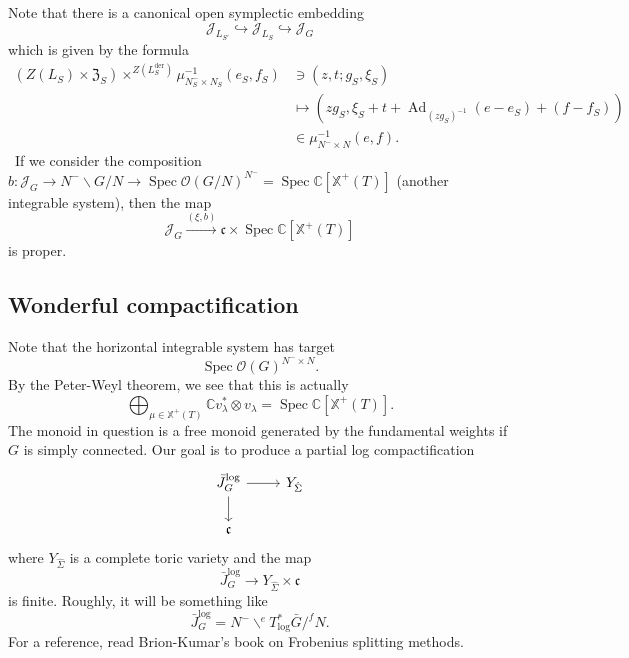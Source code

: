 \documentclass{amsart}
\theoremstyle{definition}
\theoremstyle{remark}
\theoremstyle{plain}
\theoremstyle{definition}
\theoremstyle{remark}
\newcommand{\C}{\mathbb{C}}
\newcommand{\mc}[1]{\mathcal{#1}}
\newcommand{\mf}[1]{\mathfrak{#1}}
\newcommand{\on}[1]{\operatorname{#1}}
\newcommand{\1}{\mathbf{1}}
\newcommand{\2}{\mathbf{2}}
\newcommand{\3}{\mathbf{3}}
\DeclareMathOperator{\Ad}{Ad}
\DeclareMathOperator{\Spec}{Spec}
\begin{document}
    Note that there is a canonical open symplectic embedding
    \[ \mc{J}_{L_{S'}} \hookrightarrow \mc{J}_{L_S} \hookrightarrow \mc{J}_G \]
    which is given by the formula
    \begin{align*}
        (Z(L_S) \times \mf{Z}_S) \times^{Z(L_S^{\on{der}})} \mu^{-1}_{N_S^- \times N_S}(e_S, f_S) &\ni (z,t; g_S, \xi_S) \\
        &\mapsto (z g_S, \xi_S + t + \Ad_{(z g_S)^{-1}} (e-e_S) + (f-f_S)) \\
        &\in \mu_{N^- \times N}^{-1}(e,f).
    \end{align*}\
    If we consider the composition \(b \colon \mc{J}_G \to N^- \backslash G / N \to \Spec \mc{O}(G/N)^{N^-} = \Spec \C[\mathbb{X}^+(T)]\) (another integrable system), then the map
    \[ \mc{J}_G \xrightarrow{(\xi, b)} \mf{c} \times \Spec \C[\mathbb{X}^+(T)] \]
    is proper.


\subsection{Wonderful compactification}%
\label{sub:Wonderful compactification}

Note that the horizontal integrable system has target
\[ \Spec \mc{O}(G)^{N^- \times N}. \]
By the Peter-Weyl theorem, we see that this is actually
\[ \bigoplus_{\mu \in \mathbb{X}^+(T)} \C v_{\lambda}^* \otimes v_{\lambda} = \Spec \C[\mathbb{X}^+(T)]. \]
The monoid in question is a free monoid generated by the fundamental weights if \(G\) is simply connected. Our goal is to produce a partial log compactification
\begin{equation*}
\begin{tikzcd}
    \bar{J}_G^{\log} \ar{r} \ar{d} & Y_{\hat{\Sigma}} \\
    \mf{c}
\end{tikzcd}
\end{equation*}
where \(Y_{\hat{\Sigma}}\) is a complete toric variety and the map
\[ \bar{J}_G^{\log} \to Y_{\hat{\Sigma}} \times \mf{c} \]
is finite. Roughly, it will be something like
\[ \bar{J}_G^{\log} = N^- \backslash^e T^*_{\log} \bar{G} /^f N. \]
For a reference, read Brion-Kumar's book on Frobenius splitting methods.
\end{document}
